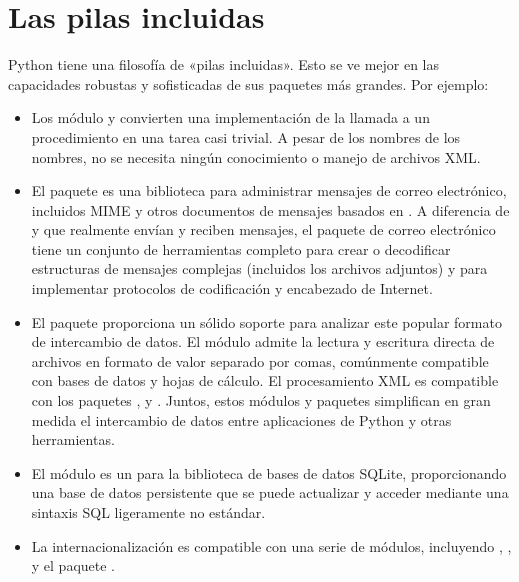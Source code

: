 \documentclass[a5paper,10pt,spanish]{sphinxmanual}
\begin{document}
\section{Las pilas incluidas}
\label{\detokenize{tutorial/stdlib:batteries-included}}\label{\detokenize{tutorial/stdlib:tut-batteries-included}}
\sphinxAtStartPar
Python tiene una filosofía de «pilas incluidas».  Esto se ve mejor en las capacidades robustas y sofisticadas de sus paquetes más grandes.  Por ejemplo:
\begin{itemize}
\item {} 
\sphinxAtStartPar
Los módulo  y  convierten una implementación de la llamada a un procedimiento en una tarea casi trivial. A pesar de los nombres de los nombres, no se necesita ningún conocimiento o manejo de archivos XML.

\item {} 
\sphinxAtStartPar
El paquete  es una biblioteca para administrar mensajes de correo electrónico, incluidos MIME y otros documentos de mensajes basados en . A diferencia de  y  que realmente envían y reciben mensajes, el paquete de correo electrónico tiene un conjunto de herramientas completo para crear o decodificar estructuras de mensajes complejas (incluidos los archivos adjuntos) y para implementar protocolos de codificación y encabezado de Internet.

\item {} 
\sphinxAtStartPar
El paquete  proporciona un sólido soporte para analizar este popular formato de intercambio de datos.  El módulo  admite la lectura y escritura directa de archivos en formato de valor separado por comas, comúnmente compatible con bases de datos y hojas de cálculo.  El procesamiento XML es compatible con los paquetes ,  y . Juntos, estos módulos y paquetes simplifican en gran medida el intercambio de datos entre aplicaciones de Python y otras herramientas.

\item {} 
\sphinxAtStartPar
El módulo  es un  para la biblioteca de bases de datos SQLite, proporcionando una base de datos persistente que se puede actualizar y acceder mediante una sintaxis SQL ligeramente no estándar.

\item {} 
\sphinxAtStartPar
La internacionalización es compatible con una serie de módulos, incluyendo , , y el paquete .

\end{itemize}
\end{document}
